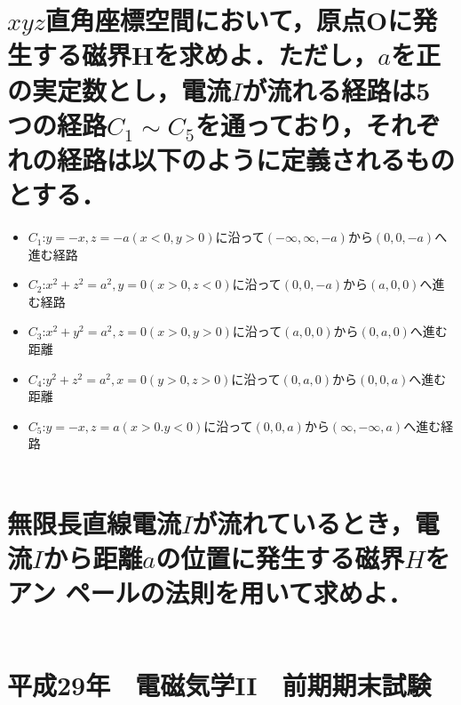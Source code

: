 \documentclass[dvipdfmx]{ujarticle}
\begin{document}
\section{$xyz$直角座標空間において，原点Oに発生する磁界$\boldsymbol{H}$を求めよ．ただし，$a$を正の実定数とし，電流$I$が流れる経路は5つの経路$C_{1}\sim C_{5}$を通っており，それぞれの経路は以下のように定義されるものとする．}
\begin{itemize}
	\item $C_{1}$:$y=-x,z=-a(x<0, y>0)$に沿って$(-\infty, \infty, -a)$から$(0, 0, -a)$へ進む経路
	\item $C_{2}$:$x^{2}+z^{2}=a^{2},y=0(x>0, z<0)$に沿って$(0, 0, -a)$から$(a, 0, 0)$へ進む経路
	\item $C_{3}$:$x^{2}+y^{2}=a^{2},z=0(x>0, y>0)$に沿って$(a, 0, 0)$から$(0, a, 0)$へ進む距離
	\item $C_{4}$:$y^{2}+z^{2}=a^{2},x=0(y>0, z>0)$に沿って$(0, a, 0)$から$(0, 0, a)$へ進む距離
	\item $C_{5}$:$y=-x, z=a(x>0. y<0)$に沿って$(0, 0, a)$から$(\infty, -\infty, a)$へ進む経路
\end{itemize}
\begin{align*}
\end{align*}

\section{無限長直線電流$I$が流れているとき，電流$I$から距離$a$の位置に発生する磁界$H$をアン
ペールの法則を用いて求めよ．}
\begin{align*}
\end{align*}

\clearpage
\setcounter{section}{0}
\section*{平成29年　電磁気学II　前期期末試験}
\end{document}
